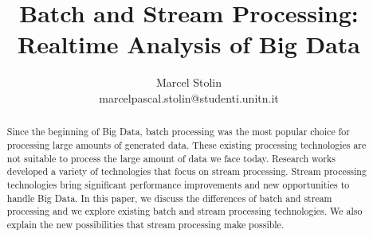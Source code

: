 \documentclass{article}
\title{Batch and Stream Processing: Realtime Analysis of Big Data}
\date{}
\author{Marcel Stolin \\ marcelpascal.stolin@studenti.unitn.it}
\begin{document}
\maketitle


\begin{abstract}
Since the beginning of Big Data, batch processing was the most popular choice for processing large amounts of generated data. These existing processing technologies are not suitable to process the large amount of data we face today. Research works developed a variety of technologies that focus on stream processing. Stream processing technologies bring significant performance improvements and new opportunities to handle Big Data. In this paper, we discuss the differences of batch and stream processing and we explore existing batch and stream processing technologies. We also explain the new possibilities that stream processing make possible.
\end{abstract}







\pagebreak
\appendix
{}

\end{document}
